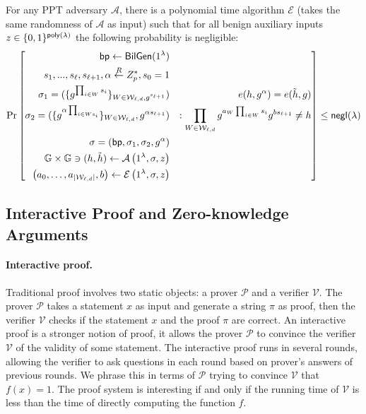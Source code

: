 \begin{assumption}
	\label{asp::dlEPKE}
	For any PPT adversary $\mathcal{A}$, there is a polynomial time algorithm $\mathcal{E}$ (takes the same randomness of $\mathcal{A}$ as input) such that for all benign auxiliary inputs $z \in \{0,1\}^{{\sf poly}({\lambda})}$ the following probability is negligible:
	\[\Pr\left[ \begin{aligned}
	\mathsf{bp} \leftarrow \mathsf{BilGen}(1^\lambda) && \\
	s_1, ..., s_\ell, s_{\ell + 1}, \alpha \overset{R}{\leftarrow} Z_{p}^*, s_0=1 && \\
	\sigma_1 = (\{g^{\prod_{i\in W}s_i}\}_{W\in \mathcal{W}_{\ell, d}, g^{s_{\ell+1}}}) &&\hspace*{10pt} e(h, g^\alpha)=e(\tilde{h}, g)\\
	\sigma_2 = (\{g^{\alpha\prod_{i\in Ws_i}}\}_{W\in \mathcal{W}_{\ell, d}}, g^{\alpha s_{\ell+1}}) && : \prod_{W\in \mathcal{W}_{\ell, d}}g^{a_{W}\prod_{i\in W}s_i}g^{b{s_{\ell+1}}}\neq h\\
	\sigma = (\mathsf{bp}, \sigma_1, \sigma_2, g^{\alpha}) && \\
	\mathbb{G} \times \mathbb{G} \ni (h, \tilde{h}) \leftarrow \mathcal{A} \left(1^{\lambda}, \sigma, z\right)&& \\
	\left( a _ { 0 } , \dots , a _ { \left| \mathcal { W } _ { \ell , d } \right| } , b \right) \leftarrow \mathcal { E } \left( 1 ^ { \lambda } , \sigma , z \right) &&
	\end{aligned}\right] \le {\sf negl}{(\lambda)}\]
\end{assumption}

\subsection{Interactive Proof and Zero-knowledge Arguments}

\paragraph{Interactive proof.} Traditional proof involves two static objects: a prover $\mathcal{P}$ and a verifier $\mathcal{V}$. The prover $\mathcal{P}$ takes a statement $x$ as input and generate a string $\pi$ as proof, then the verifier $\mathcal{V}$ checks if the statement $x$ and the proof $\pi$ are correct. An interactive proof is a stronger notion of proof, it allows the prover $\mathcal{P}$ to convince the verifier $\mathcal{V}$ of the validity of some statement. The interactive proof runs in several rounds, allowing the verifier to ask questions in each round based on prover's answers of previous rounds. We phrase this in terms of $\mathcal{P}$ trying to convince $\mathcal{V}$ that $f(x)=1$. The proof system is interesting if and only if the running time of $\mathcal{V}$ is less than the time of directly computing the function $f$.

